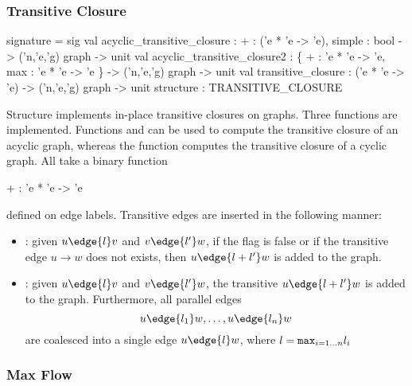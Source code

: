 \subsubsection{Transitive Closure}
\begin{SML}
 signature  = sig
    val acyclic_transitive_closure : {  + : ('e * 'e -> 'e), simple : bool }
        -> ('n,'e,'g) graph -> unit
    val acyclic_transitive_closure2 : 
       \{  + : 'e * 'e -> 'e,
          max : 'e * 'e -> 'e
       \}  -> ('n,'e,'g) graph -> unit
    val transitive_closure : ('e * 'e -> 'e) -> ('n,'e,'g) graph -> unit
 structure  : TRANSITIVE_CLOSURE
\end{SML}
Structure  implements
in-place transitive closures on graphs.   Three functions are implemented.
Functions  and 
 can be used
to compute the transitive closure of an acyclic graph, whereas the
function  computes the transitive closure of
a cyclic graph.  All take a binary function 
\begin{SML}
  + : 'e * 'e -> 'e
\end{SML}
defined on edge labels.  
Transitive edges are inserted in the following manner:

\begin{itemize}
 \item {}:
   given $u \edge{l} v$ and $v \edge{l'} w$, 
if the flag  is false or if 
the transitive edge $u \rightarrow w$ does not exists,
then $u \edge{l + l'} w$ is added to the graph.
 \item {}:
   given $u \edge{l} v$ and $v \edge{l'} w$, 
the transitive $u \edge{l + l'} w$ is added to the graph.
  Furthermore, all parallel edges 
\[ 
   u \edge{l_1} w, \ldots, u \edge{l_n} w 
\]
are coalesced into a single edge $u \edge{l} w$, where 
$l = {\tt max}_{i = 1 \ldots n} l_i$ 
\end{itemize}

\subsubsection{Max Flow}


